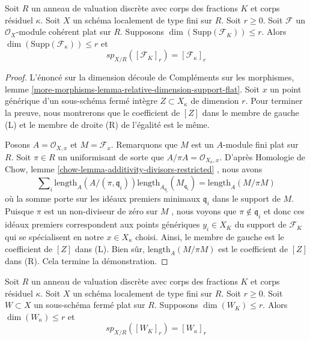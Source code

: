 \begin{lemma} 
\label{lemma-specialization-module} 
Soit  $R$  un anneau de valuation discrète avec corps des fractions $K$  et corps résiduel  
$\kappa$. Soit  $X$  un schéma localement de type fini sur  $R$. Soit  $r \geq 0$. 
Soit  $\mathcal{F}$  un $\mathcal{O}_X$-module cohérent plat sur  $R$. Supposons  
$\dim(\text{Supp}(\mathcal{F}_K)) \leq r$. Alors 
$\dim(\text{Supp}(\mathcal{F}_\kappa)) \leq r$  et 
$$
sp_{X/R}([\mathcal{F}_K]_r) = [\mathcal{F}_\kappa]_r
$$
\end{lemma} 

\begin{proof} 
L'énoncé sur la dimension découle de Compléments sur les morphismes, lemme 
\ref{more-morphisms-lemma-relative-dimension-support-flat}. 
Soit  $x$  un point générique d'un sous-schéma fermé intègre  
$Z \subset X_\kappa$ de dimension  $r$. Pour terminer la preuve,
 nous montrerons que le coefficient de $[Z]$
 dans le membre de gauche (L) et le membre de droite (R) de l’égalité est le même. 

\medskip\noindent
 Posons $A = \mathcal{O}_{X, x}$ et $M = \mathcal{F}_x$.
 Remarquons que  $M$  est un $A$-module fini plat sur  $R$. 
Soit  $\pi \in R$  un uniformisant de sorte que  
$A/\pi A = \mathcal{O}_{X_\kappa, x}$.
 D'après Homologie de Chow, lemme \ref{chow-lemma-additivity-divisors-restricted} , nous
 avons 
$$
\sum\nolimits_i \text{length}_A(A/(\pi, \mathfrak q_i))
\text{length}_{A_{\mathfrak q_i}}(M_{\mathfrak q_i}) =
\text{length}_A(M/\pi M)
$$
 où la somme porte sur les idéaux premiers minimaux  
$\mathfrak q_i$  dans le support de $M$. 
Puisque  $\pi$  est un non-diviseur de zéro sur  $M$ , nous voyons
 que  $\pi \not \in \mathfrak q_i$  et donc ces
 idéaux premiers correspondent aux points génériques  $y_i \in X_K$  du 
support de  $\mathcal{F}_K$  qui se spécialisent en notre $x \in X_\kappa$ 
choisi. Ainsi, le membre de gauche est le coefficient de  $[Z]$
  dans (L). Bien sûr,  $\text{length}_A(M/\pi M)$  est le coefficient 
de  $[Z]$  dans (R). Cela termine la démonstration. 
\end{proof} 

\begin{lemma} 
\label{lemma-specialization-closed} 
Soit  $R$  un anneau de valuation discrète avec corps des fractions $K$  et corps résiduel  
$\kappa$. Soit  $X$  un schéma localement de type fini sur  $R$. Soit  $r \geq 0$. 
Soit  $W \subset X$  un sous-schéma fermé plat sur  $R$. Supposons  
$\dim(W_K) \leq r$. Alors $\dim(W_\kappa) \leq r$  et 
$$
sp_{X/R}([W_K]_r) = [W_\kappa]_r
$$
\end{lemma} 

